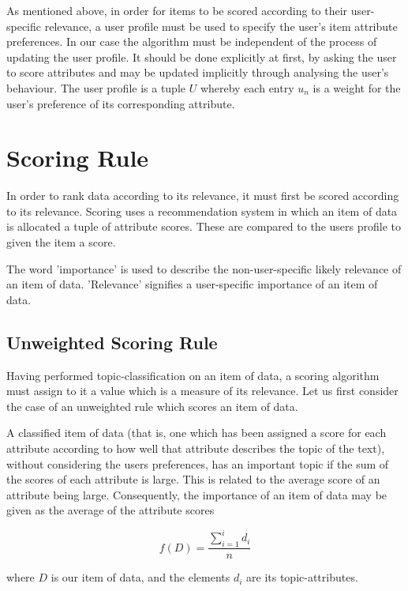 As mentioned above, in order for items to be scored according to their user-specific relevance, a user profile must be used to specify the user's item attribute preferences. In our case the algorithm must be independent of the process of updating the user profile. It should be done explicitly at first, by asking the user to score attributes and may be updated implicitly through analysing the user's behaviour. The user profile is a tuple $U$ whereby each entry $u_n$ is a weight for the user's preference of its corresponding attribute.

\section{Scoring Rule}

In order to rank data according to its relevance, it must first be scored according to its relevance. Scoring uses a recommendation system in which an item of data is allocated a tuple of attribute scores. These are compared to the users profile to given the item a score. 

The word 'importance' is used to describe the non-user-specific likely relevance of an item of data. 'Relevance' signifies a user-specific importance of an item of data.

\subsection{Unweighted Scoring Rule}

Having performed topic-classification on an item of data, a scoring algorithm must assign to it a value which is a measure of its relevance. Let us first consider the case of an unweighted rule which scores an item of data. 

A classified item of data (that is, one which has been assigned a score for each attribute according to how well that attribute describes the topic of the text), without considering the users preferences, has an important topic if the sum of the scores of each attribute is large. This is related to the average score of an attribute being large. Consequently, the importance of an item of data may be given as the average of the attribute scores

\begin{equation}\label{AverageUnweightedRule}	
	f(D) = \frac{\sum_{i=1}^{i} d_i}{n}
\end{equation}

where $D$ is our item of data, and the elements $d_i$ are its topic-attributes. 

